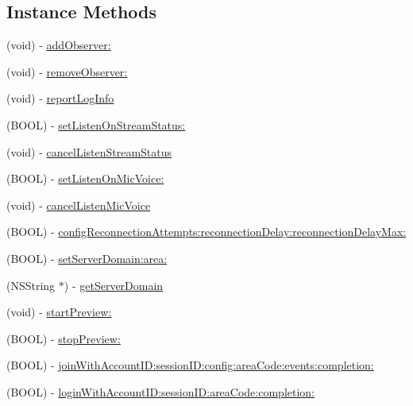 \subsection*{Instance Methods}
\begin{DoxyCompactItemize}
\item 
(void) -\/ \hyperlink{interface_c_c_streamer_basic_ad25d3d5930be6f375133272c6ff30324}{add\+Observer\+:}
\item 
(void) -\/ \hyperlink{interface_c_c_streamer_basic_a3b6770a7d93808beee1672f04c9090cb}{remove\+Observer\+:}
\item 
(void) -\/ \hyperlink{interface_c_c_streamer_basic_ad2772456b583a89888dba4f3157482a9}{report\+Log\+Info}
\item 
(B\+O\+OL) -\/ \hyperlink{interface_c_c_streamer_basic_aacdba77baffd5cb28756e69bcb7c0b2a}{set\+Listen\+On\+Stream\+Status\+:}
\item 
(void) -\/ \hyperlink{interface_c_c_streamer_basic_a59fe933b6b48901516931bd0d88673d0}{cancel\+Listen\+Stream\+Status}
\item 
(B\+O\+OL) -\/ \hyperlink{interface_c_c_streamer_basic_a742507c8281ac96c43a9636371077de8}{set\+Listen\+On\+Mic\+Voice\+:}
\item 
(void) -\/ \hyperlink{interface_c_c_streamer_basic_a18e7a9db02dd15236818f169b60975ee}{cancel\+Listen\+Mic\+Voice}
\item 
(B\+O\+OL) -\/ \hyperlink{interface_c_c_streamer_basic_a33e6149b5a9e325bf2f69fff6b1353d5}{config\+Reconnection\+Attempts\+:reconnection\+Delay\+:reconnection\+Delay\+Max\+:}
\item 
(B\+O\+OL) -\/ \hyperlink{interface_c_c_streamer_basic_ad9fbe9111472b624255976c998a7a16f}{set\+Server\+Domain\+:area\+:}
\item 
(N\+S\+String $\ast$) -\/ \hyperlink{interface_c_c_streamer_basic_a78dad7e95f697219990fb73486db9807}{get\+Server\+Domain}
\item 
(void) -\/ \hyperlink{interface_c_c_streamer_basic_a719419e4a1d870d984373391e67eec27}{start\+Preview\+:}
\item 
(B\+O\+OL) -\/ \hyperlink{interface_c_c_streamer_basic_a67d4c1109da3c868368a0af1dc66ddf5}{stop\+Preview\+:}
\item 
(B\+O\+OL) -\/ \hyperlink{interface_c_c_streamer_basic_a637f17e6b34cda147b5f737f89faa9b5}{join\+With\+Account\+I\+D\+:session\+I\+D\+:config\+:area\+Code\+:events\+:completion\+:}
\item 
(B\+O\+OL) -\/ \hyperlink{interface_c_c_streamer_basic_a56a0d95094f6c4b9faf2e6c526bf6222}{login\+With\+Account\+I\+D\+:session\+I\+D\+:area\+Code\+:completion\+:}

\end{DoxyCompactItemize}
